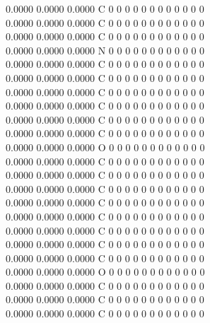 \documentclass[11pt,titlepage,dvipdfmx,twoside]{jarticle}
\begin{document}
\begin{oframed}
{    0.0000    0.0000    0.0000  C  0  0  0  0  0  0  0  0  0  0  0  0   \\
    0.0000    0.0000    0.0000  C  0  0  0  0  0  0  0  0  0  0  0  0   \\
    0.0000    0.0000    0.0000  C  0  0  0  0  0  0  0  0  0  0  0  0   \\
    0.0000    0.0000    0.0000  N  0  0  0  0  0  0  0  0  0  0  0  0   \\
    0.0000    0.0000    0.0000  C  0  0  0  0  0  0  0  0  0  0  0  0   \\
    0.0000    0.0000    0.0000  C  0  0  0  0  0  0  0  0  0  0  0  0   \\
    0.0000    0.0000    0.0000  C  0  0  0  0  0  0  0  0  0  0  0  0   \\
    0.0000    0.0000    0.0000  C  0  0  0  0  0  0  0  0  0  0  0  0   \\
    0.0000    0.0000    0.0000  C  0  0  0  0  0  0  0  0  0  0  0  0   \\
    0.0000    0.0000    0.0000  C  0  0  0  0  0  0  0  0  0  0  0  0   \\
    0.0000    0.0000    0.0000  O  0  0  0  0  0  0  0  0  0  0  0  0   \\
    0.0000    0.0000    0.0000  C  0  0  0  0  0  0  0  0  0  0  0  0   \\
    0.0000    0.0000    0.0000  C  0  0  0  0  0  0  0  0  0  0  0  0   \\
    0.0000    0.0000    0.0000  C  0  0  0  0  0  0  0  0  0  0  0  0   \\
    0.0000    0.0000    0.0000  C  0  0  0  0  0  0  0  0  0  0  0  0   \\
    0.0000    0.0000    0.0000  C  0  0  0  0  0  0  0  0  0  0  0  0   \\
    0.0000    0.0000    0.0000  C  0  0  0  0  0  0  0  0  0  0  0  0   \\
    0.0000    0.0000    0.0000  C  0  0  0  0  0  0  0  0  0  0  0  0   \\
    0.0000    0.0000    0.0000  C  0  0  0  0  0  0  0  0  0  0  0  0   \\
    0.0000    0.0000    0.0000  O  0  0  0  0  0  0  0  0  0  0  0  0   \\
    0.0000    0.0000    0.0000  C  0  0  0  0  0  0  0  0  0  0  0  0   \\
    0.0000    0.0000    0.0000  C  0  0  0  0  0  0  0  0  0  0  0  0   \\
    0.0000    0.0000    0.0000  C  0  0  0  0  0  0  0  0  0  0  0  0   \\
}
\end{oframed}
\end{document}
